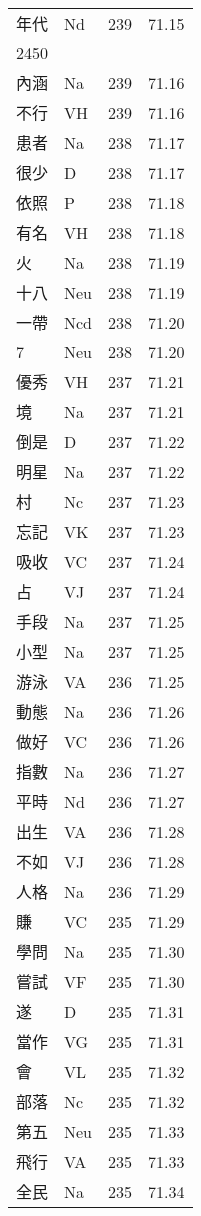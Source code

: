 \documentclass[twocolumn]{book}
\begin{document}
\begin{supertabular}{llrr}
年代 & Nd & 239 &  71.15\\
2450\\
內涵 & Na & 239 &  71.16\\
不行 & VH & 239 &  71.16\\
患者 & Na & 238 &  71.17\\
很少 & D & 238 &  71.17\\
依照 & P & 238 &  71.18\\
有名 & VH & 238 &  71.18\\
火 & Na & 238 &  71.19\\
十八 & Neu & 238 &  71.19\\
一帶 & Ncd & 238 &  71.20\\
7 & Neu & 238 &  71.20\\
優秀 & VH & 237 &  71.21\\
境 & Na & 237 &  71.21\\
倒是 & D & 237 &  71.22\\
明星 & Na & 237 &  71.22\\
村 & Nc & 237 &  71.23\\
忘記 & VK & 237 &  71.23\\
吸收 & VC & 237 &  71.24\\
占 & VJ & 237 &  71.24\\
手段 & Na & 237 &  71.25\\
小型 & Na & 237 &  71.25\\
游泳 & VA & 236 &  71.25\\
動態 & Na & 236 &  71.26\\
做好 & VC & 236 &  71.26\\
指數 & Na & 236 &  71.27\\
平時 & Nd & 236 &  71.27\\
出生 & VA & 236 &  71.28\\
不如 & VJ & 236 &  71.28\\
人格 & Na & 236 &  71.29\\
賺 & VC & 235 &  71.29\\
學問 & Na & 235 &  71.30\\
嘗試 & VF & 235 &  71.30\\
遂 & D & 235 &  71.31\\
當作 & VG & 235 &  71.31\\
會 & VL & 235 &  71.32\\
部落 & Nc & 235 &  71.32\\
第五 & Neu & 235 &  71.33\\
飛行 & VA & 235 &  71.33\\
全民 & Na & 235 &  71.34\\

\end{supertabular}
\end{document}

